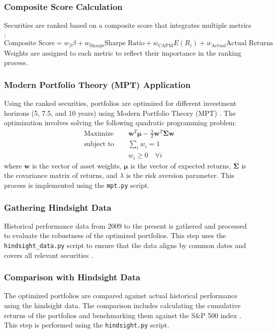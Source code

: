 \subsubsection{Composite Score Calculation}
Securities are ranked based on a composite score that integrates multiple metrics \citep{jones1992investments}:
\begin{equation}
    \text{Composite Score} = w_{\beta} \beta + w_{\text{Sharpe}} \text{Sharpe Ratio} + w_{\text{CAPM}} E(R_i) + w_{\text{Actual}} \text{Actual Returns}
\end{equation}
Weights are assigned to each metric to reflect their importance in the ranking process.

\subsubsection{Modern Portfolio Theory (MPT) Application}
Using the ranked securities, portfolios are optimized for different investment horizons (5, 7.5, and 10 years) using Modern Portfolio Theory (MPT) \citep{markowitz1952portfolio}. The optimization involves solving the following quadratic programming problem:
\begin{align}
    \text{Maximize } & \quad \mathbf{w}^T \mathbf{\mu} - \frac{\lambda}{2} \mathbf{w}^T \mathbf{\Sigma} \mathbf{w} \\
    \text{subject to} & \quad \sum_{i} w_i = 1 \\
    & \quad w_i \geq 0 \quad \forall i
\end{align}
where \(\mathbf{w}\) is the vector of asset weights, \(\mathbf{\mu}\) is the vector of expected returns, \(\mathbf{\Sigma}\) is the covariance matrix of returns, and \(\lambda\) is the risk aversion parameter. This process is implemented using the \texttt{mpt.py} script.

\subsubsection{Gathering Hindsight Data}
Historical performance data from 2009 to the present is gathered and processed to evaluate the robustness of the optimized portfolios. This step uses the \texttt{hindsight\_data.py} script to ensure that the data aligns by common dates and covers all relevant securities \citep{bls2023}.

\subsubsection{Comparison with Hindsight Data}
The optimized portfolios are compared against actual historical performance using the hindsight data. The comparison includes calculating the cumulative returns of the portfolios and benchmarking them against the S\&P 500 index \citep{nar}. This step is performed using the \texttt{hindsight.py} script.

